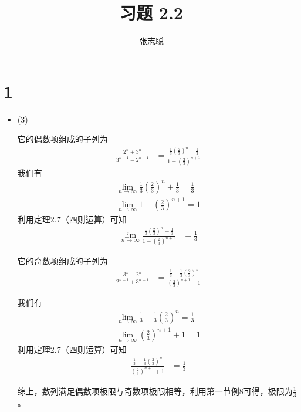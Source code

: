 \documentclass{article}
\begin{document}
\title{习题 2.2}
\author{张志聪}
\maketitle

\section*{1}

\begin{itemize}
  \item (3)

        它的偶数项组成的子列为
        \begin{align*}
          \frac{2^n + 3^n}{3^{n + 1} - 2^{n + 1}}
           & = \frac{\frac{1}{3}\left(\frac{2}{3}\right)^n + \frac{1}{3}}{1 - \left(\frac{2}{3}\right)^{n + 1}}
        \end{align*}
        我们有
        \begin{align*}
          \lim\limits_{n \to \infty} \frac{1}{3}\left(\frac{2}{3}\right)^n + \frac{1}{3} = \frac{1}{3} \\
          \lim\limits_{n \to \infty} 1 - \left(\frac{2}{3}\right)^{n + 1} = 1
        \end{align*}
        利用定理2.7（四则运算）可知
        \begin{align*}
          \lim\limits_{n \to \infty}  \frac{\frac{1}{3}\left(\frac{2}{3}\right)^n + \frac{1}{3}}{1 - \left(\frac{2}{3}\right)^{n + 1}}
           & = \frac{1}{3}
        \end{align*}

        它的奇数项组成的子列为
        \begin{align*}
          \frac{3^n - 2^n}{2^{n + 1} + 3^{n + 1}}
           & = \frac{\frac{1}{3} - \frac{1}{3}\left(\frac{2}{3}\right)^{n}}{(\frac{2}{3})^{n + 1} + 1}
        \end{align*}

        我们有
        \begin{align*}
          \lim\limits_{n \to \infty} \frac{1}{3} - \frac{1}{3}\left(\frac{2}{3}\right)^{n} = \frac{1}{3} \\
          \lim\limits_{n \to \infty} (\frac{2}{3})^{n + 1} + 1 = 1
        \end{align*}
        利用定理2.7（四则运算）可知
        \begin{align*}
          \frac{\frac{1}{3} - \frac{1}{3}\left(\frac{2}{3}\right)^{n}}{(\frac{2}{3})^{n + 1} + 1}
           & = \frac{1}{3}
        \end{align*}

        综上，数列满足偶数项极限与奇数项极限相等，利用第一节例8可得，极限为$\frac{1}{3}$。
\end{itemize}
\end{document}
